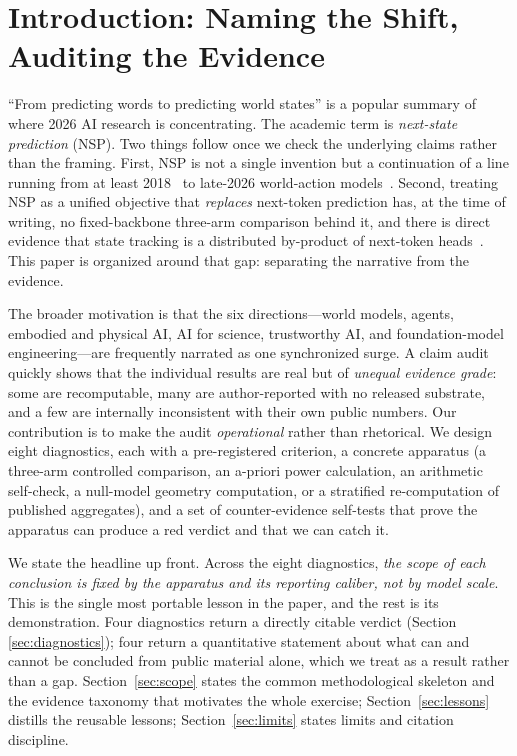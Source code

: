 \section{Introduction: Naming the Shift, Auditing the Evidence}
\label{sec:intro}

``From predicting words to predicting world states'' is a popular summary of where
2026 AI research is concentrating. The academic term is \emph{next-state
prediction} (NSP). Two things follow once we check the underlying claims rather
than the framing. First, NSP is not a single invention but a continuation of a
line running from at least 2018~\cite{worldmodels2018} to late-2026 world-action
models~\cite{wam2026}. Second, treating NSP as a unified objective that
\emph{replaces} next-token prediction has, at the time of writing, no
fixed-backbone three-arm comparison behind it, and there is direct evidence that
state tracking is a distributed by-product of next-token
heads~\cite{statelaws2025}. This paper is organized around that gap: separating
the narrative from the evidence.

The broader motivation is that the six directions---world models, agents, embodied
and physical AI, AI for science, trustworthy AI, and foundation-model
engineering---are frequently narrated as one synchronized surge. A claim audit
quickly shows that the individual results are real but of \emph{unequal evidence
grade}: some are recomputable, many are author-reported with no released
substrate, and a few are internally inconsistent with their own public numbers.
Our contribution is to make the audit \emph{operational} rather than rhetorical.
We design eight diagnostics, each with a pre-registered criterion, a concrete
apparatus (a three-arm controlled comparison, an a-priori power calculation, an
arithmetic self-check, a null-model geometry computation, or a stratified
re-computation of published aggregates), and a set of counter-evidence self-tests
that prove the apparatus can produce a red verdict and that we can catch it.

We state the headline up front. Across the eight diagnostics, \emph{the scope of
each conclusion is fixed by the apparatus and its reporting caliber, not by model
scale}. This is the single most portable lesson in the paper, and the rest is
its demonstration. Four diagnostics return a directly citable verdict (Section
\ref{sec:diagnostics}); four return a quantitative statement about what can and
cannot be concluded from public material alone, which we treat as a result rather
than a gap. Section~\ref{sec:scope} states the common methodological skeleton and
the evidence taxonomy that motivates the whole exercise; Section~\ref{sec:lessons}
distills the reusable lessons; Section~\ref{sec:limits} states limits and citation
discipline.